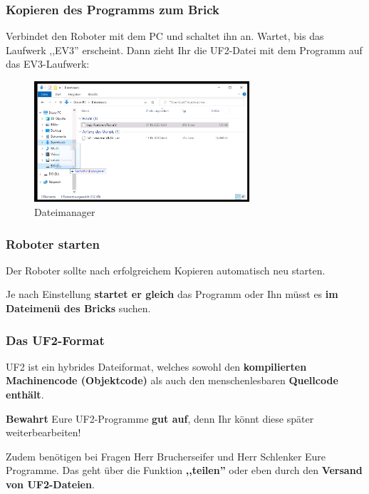 \documentclass{beamer}
\begin{document}
\begin{frame}
\frametitle{Kopieren des Programms zum Brick}
Verbindet den Roboter mit dem PC und schaltet ihn an. Wartet, bis das Laufwerk ,,EV3'' erscheint. Dann zieht Ihr die UF2-Datei mit dem Programm auf das EV3-Laufwerk:

\begin{figure}
  \includegraphics[width=8cm]{mkcd02.png}
  \caption{Dateimanager}
  \label{fig:mkcd2}
\end{figure}
\end{frame}


\begin{frame}
\frametitle{Roboter starten}

Der Roboter sollte nach erfolgreichem Kopieren automatisch neu starten. 

Je nach Einstellung \textbf{startet er gleich} das Programm oder Ihn müsst es \textbf{im Dateimenü des Bricks} suchen. 

\end{frame}

\begin{frame}
\frametitle{Das UF2-Format}

UF2 ist ein hybrides Dateiformat, welches sowohl den \textbf{kompilierten Machinencode (Objektcode)} als auch den menschenlesbaren \textbf{Quellcode enthält}.

\textbf{Bewahrt} Eure UF2-Programme \textbf{gut auf}, denn Ihr könnt diese später weiterbearbeiten! 

Zudem benötigen bei Fragen Herr Brucherseifer und Herr Schlenker Eure Programme. Das geht über die Funktion \textbf{,,teilen''} oder eben durch den \textbf{Versand von UF2-Dateien}.

\end{frame}
\end{document}
